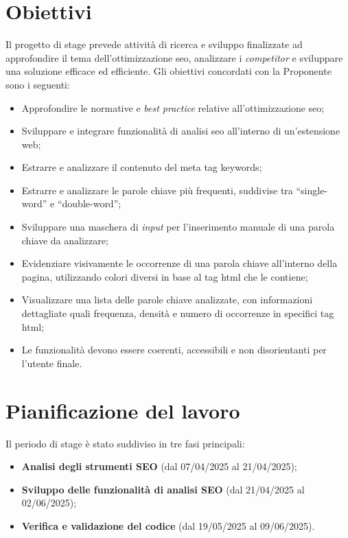 \section{Obiettivi}
\label{sec:obiettivi}

Il progetto di stage prevede attività di ricerca e sviluppo finalizzate ad approfondire il tema dell’ottimizzazione \gls{seo}, analizzare i \textit{competitor} e sviluppare una soluzione efficace ed efficiente. Gli obiettivi concordati con la Proponente sono i seguenti:

\begin{itemize}
  \item Approfondire le normative e \textit{best practice} relative all’ottimizzazione \gls{seo};
  \item Sviluppare e integrare funzionalità di analisi \gls{seo} all’interno di un’estensione web;
  \item Estrarre e analizzare il contenuto del meta tag keywords;
  \item Estrarre e analizzare le parole chiave più frequenti, suddivise tra “single-word” e “double-word”;
  \item Sviluppare una maschera di \textit{input} per l’inserimento manuale di una parola chiave da analizzare;
  \item Evidenziare visivamente le occorrenze di una parola chiave all’interno della pagina, utilizzando colori diversi in base al tag \gls{html} che le contiene;
  \item Visualizzare una lista delle parole chiave analizzate, con informazioni dettagliate quali frequenza, densità e numero di occorrenze in specifici tag \gls{html};
  \item Le funzionalità devono essere coerenti, accessibili e non disorientanti per l’utente finale.
\end{itemize}

\section{Pianificazione del lavoro}
\label{sec:pianificazione}

Il periodo di stage è stato suddiviso in tre fasi principali:
\begin{itemize}
  \item \textbf{Analisi degli strumenti SEO} (dal 07/04/2025 al 21/04/2025);
  \item \textbf{Sviluppo delle funzionalità di analisi SEO} (dal 21/04/2025 al 02/06/2025);
  \item \textbf{Verifica e validazione del codice} (dal 19/05/2025 al 09/06/2025).
\end{itemize}


